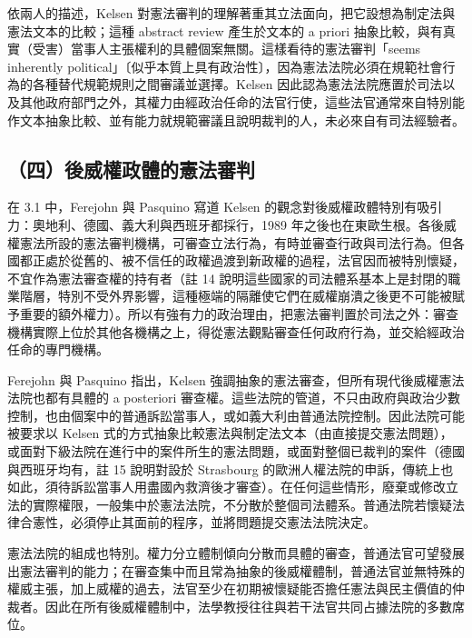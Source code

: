 依兩人的描述，Kelsen 對憲法審判的理解著重其立法面向，把它設想為制定法與憲法文本的比較；這種 abstract review 產生於文本的 a priori 抽象比較，與有真實（受害）當事人主張權利的具體個案無關。這樣看待的憲法審判「seems inherently political」〔似乎本質上具有政治性〕，因為憲法法院必須在規範社會行為的各種替代規範規則之間審議並選擇。Kelsen 因此認為憲法法院應置於司法以及其他政府部門之外，其權力由經政治任命的法官行使，這些法官通常來自特別能作文本抽象比較、並有能力就規範審議且說明裁判的人，未必來自有司法經驗者。

\subsection{（四）後威權政體的憲法審判}

在 3.1 中，Ferejohn 與 Pasquino 寫道 Kelsen 的觀念對後威權政體特別有吸引力：奧地利、德國、義大利與西班牙都採行，1989 年之後也在東歐生根。各後威權憲法所設的憲法審判機構，可審查立法行為，有時並審查行政與司法行為。但各國都正處於從舊的、被不信任的政權過渡到新政權的過程，法官因而被特別懷疑，不宜作為憲法審查權的持有者（註 14 說明這些國家的司法體系基本上是封閉的職業階層，特別不受外界影響，這種極端的隔離使它們在威權崩潰之後更不可能被賦予重要的額外權力）。所以有強有力的政治理由，把憲法審判置於司法之外：審查機構實際上位於其他各機構之上，得從憲法觀點審查任何政府行為，並交給經政治任命的專門機構。

Ferejohn 與 Pasquino 指出，Kelsen 強調抽象的憲法審查，但所有現代後威權憲法法院也都有具體的 a posteriori 審查權。這些法院的管道，不只由政府與政治少數控制，也由個案中的普通訴訟當事人，或如義大利由普通法院控制。因此法院可能被要求以 Kelsen 式的方式抽象比較憲法與制定法文本（由直接提交憲法問題），或面對下級法院在進行中的案件所生的憲法問題，或面對整個已裁判的案件（德國與西班牙均有，註 15 說明對設於 Strasbourg 的歐洲人權法院的申訴，傳統上也如此，須待訴訟當事人用盡國內救濟後才審查）。在任何這些情形，廢棄或修改立法的實際權限，一般集中於憲法法院，不分散於整個司法體系。普通法院若懷疑法律合憲性，必須停止其面前的程序，並將問題提交憲法法院決定。

憲法法院的組成也特別。權力分立體制傾向分散而具體的審查，普通法官可望發展出憲法審判的能力；在審查集中而且常為抽象的後威權體制，普通法官並無特殊的權威主張，加上威權的過去，法官至少在初期被懷疑能否擔任憲法與民主價值的仲裁者。因此在所有後威權體制中，法學教授往往與若干法官共同占據法院的多數席位。

